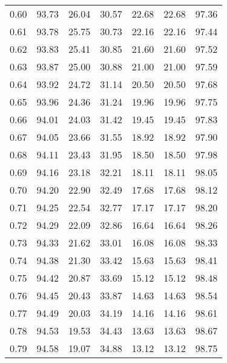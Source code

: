 \begin{tabular}{|c|c|c|c|c|c|c|}
      0.60 &     93.73 &     26.04 &      30.57 &   22.68 &      22.68 &         97.36 \\
      0.61 &     93.78 &     25.75 &      30.73 &   22.16 &      22.16 &         97.44 \\
      0.62 &     93.83 &     25.41 &      30.85 &   21.60 &      21.60 &         97.52 \\
      0.63 &     93.87 &     25.00 &      30.88 &   21.00 &      21.00 &         97.59 \\
      0.64 &     93.92 &     24.72 &      31.14 &   20.50 &      20.50 &         97.68 \\
      0.65 &     93.96 &     24.36 &      31.24 &   19.96 &      19.96 &         97.75 \\
      0.66 &     94.01 &     24.03 &      31.42 &   19.45 &      19.45 &         97.83 \\
      0.67 &     94.05 &     23.66 &      31.55 &   18.92 &      18.92 &         97.90 \\
      0.68 &     94.11 &     23.43 &      31.95 &   18.50 &      18.50 &         97.98 \\
      0.69 &     94.16 &     23.18 &      32.21 &   18.11 &      18.11 &         98.05 \\
      0.70 &     94.20 &     22.90 &      32.49 &   17.68 &      17.68 &         98.12 \\
      0.71 &     94.25 &     22.54 &      32.77 &   17.17 &      17.17 &         98.20 \\
      0.72 &     94.29 &     22.09 &      32.86 &   16.64 &      16.64 &         98.26 \\
      0.73 &     94.33 &     21.62 &      33.01 &   16.08 &      16.08 &         98.33 \\
      0.74 &     94.38 &     21.30 &      33.42 &   15.63 &      15.63 &         98.41 \\
      0.75 &     94.42 &     20.87 &      33.69 &   15.12 &      15.12 &         98.48 \\
      0.76 &     94.45 &     20.43 &      33.87 &   14.63 &      14.63 &         98.54 \\
      0.77 &     94.49 &     20.03 &      34.19 &   14.16 &      14.16 &         98.61 \\
      0.78 &     94.53 &     19.53 &      34.43 &   13.63 &      13.63 &         98.67 \\
      0.79 &     94.58 &     19.07 &      34.88 &   13.12 &      13.12 &         98.75 \\

\end{tabular}
